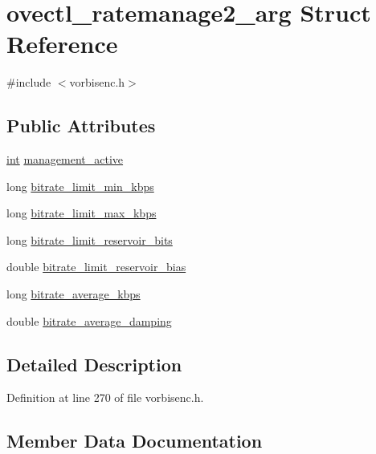 \hypertarget{structovectl__ratemanage2__arg}{}\section{ovectl\+\_\+ratemanage2\+\_\+arg Struct Reference}
\label{structovectl__ratemanage2__arg}


{\ttfamily \#include $<$vorbisenc.\+h$>$}

\subsection*{Public Attributes}
\begin{DoxyCompactItemize}
\item 
\hyperlink{xmltok_8h_a5a0d4a5641ce434f1d23533f2b2e6653}{int} \hyperlink{structovectl__ratemanage2__arg_aca1f656373a1597177dac924578e375b}{management\+\_\+active}
\item 
long \hyperlink{structovectl__ratemanage2__arg_aeb53a17fff14ec50d143602adfdeabeb}{bitrate\+\_\+limit\+\_\+min\+\_\+kbps}
\item 
long \hyperlink{structovectl__ratemanage2__arg_a175691482003edd7d94592fa2bc993a9}{bitrate\+\_\+limit\+\_\+max\+\_\+kbps}
\item 
long \hyperlink{structovectl__ratemanage2__arg_a75e496acac882e156137de9d1200ebd7}{bitrate\+\_\+limit\+\_\+reservoir\+\_\+bits}
\item 
double \hyperlink{structovectl__ratemanage2__arg_a5567fde1798b1e80e40a77565b4b44f4}{bitrate\+\_\+limit\+\_\+reservoir\+\_\+bias}
\item 
long \hyperlink{structovectl__ratemanage2__arg_a1f6bab60d87143d5060dd6c59aad6e71}{bitrate\+\_\+average\+\_\+kbps}
\item 
double \hyperlink{structovectl__ratemanage2__arg_a1069e148a884d8706928cd2e39870720}{bitrate\+\_\+average\+\_\+damping}
\end{DoxyCompactItemize}


\subsection{Detailed Description}


Definition at line 270 of file vorbisenc.\+h.



\subsection{Member Data Documentation}
